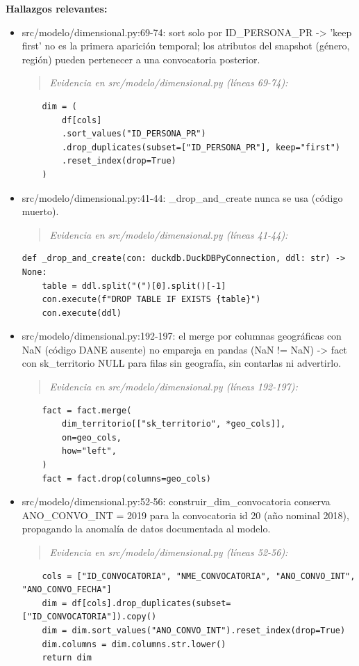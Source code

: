 \textbf{Hallazgos relevantes:}
\begin{itemize}
  \item src/modelo/dimensional.py:69-74: sort solo por ID\_PERSONA\_PR -> 'keep first' no es la primera aparición temporal; los atributos del snapshot (género, región) pueden pertenecer a una convocatoria posterior.
\begin{quote}\footnotesize\ttfamily
\noindent\emph{Evidencia en src/modelo/dimensional.py (líneas 69-74):}
\end{quote}
\begin{lstlisting}
    dim = (
        df[cols]
        .sort_values("ID_PERSONA_PR")
        .drop_duplicates(subset=["ID_PERSONA_PR"], keep="first")
        .reset_index(drop=True)
    )
\end{lstlisting}

  \item src/modelo/dimensional.py:41-44: \_drop\_and\_create nunca se usa (código muerto).
\begin{quote}\footnotesize\ttfamily
\noindent\emph{Evidencia en src/modelo/dimensional.py (líneas 41-44):}
\end{quote}
\begin{lstlisting}
def _drop_and_create(con: duckdb.DuckDBPyConnection, ddl: str) -> None:
    table = ddl.split("(")[0].split()[-1]
    con.execute(f"DROP TABLE IF EXISTS {table}")
    con.execute(ddl)
\end{lstlisting}

  \item src/modelo/dimensional.py:192-197: el merge por columnas geográficas con NaN (código DANE ausente) no empareja en pandas (NaN != NaN) -> fact con sk\_territorio NULL para filas sin geografía, sin contarlas ni advertirlo.
\begin{quote}\footnotesize\ttfamily
\noindent\emph{Evidencia en src/modelo/dimensional.py (líneas 192-197):}
\end{quote}
\begin{lstlisting}
    fact = fact.merge(
        dim_territorio[["sk_territorio", *geo_cols]],
        on=geo_cols,
        how="left",
    )
    fact = fact.drop(columns=geo_cols)
\end{lstlisting}

  \item src/modelo/dimensional.py:52-56: construir\_dim\_convocatoria conserva ANO\_CONVO\_INT = 2019 para la convocatoria id 20 (año nominal 2018), propagando la anomalía de datos documentada al modelo.
\begin{quote}\footnotesize\ttfamily
\noindent\emph{Evidencia en src/modelo/dimensional.py (líneas 52-56):}
\end{quote}
\begin{lstlisting}
    cols = ["ID_CONVOCATORIA", "NME_CONVOCATORIA", "ANO_CONVO_INT", "ANO_CONVO_FECHA"]
    dim = df[cols].drop_duplicates(subset=["ID_CONVOCATORIA"]).copy()
    dim = dim.sort_values("ANO_CONVO_INT").reset_index(drop=True)
    dim.columns = dim.columns.str.lower()
    return dim
\end{lstlisting}

\end{itemize}


